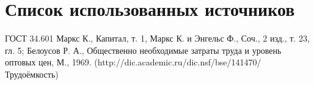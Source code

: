 \section*{Список использованных источников}

\begin{thebibliography}{99}
	 ГОСТ 34.601
	 Маркс К., Капитал, т. 1, Маркс К. и Энгельс Ф., Соч., 2 изд., т. 23, гл. 5; Белоусов Р. А., Общественно необходимые затраты труда и уровень оптовых цен, М., 1969. (http://dic.academic.ru/dic.nsf/bse/141470/Трудоёмкость)
\end{thebibliography}

\clearpage
\newpage